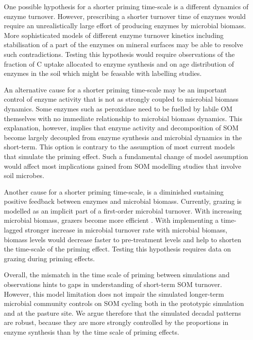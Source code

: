 One possible hypothesis for a shorter priming time-scale is a different dynamics
of enzyme turnover. However, prescribing a shorter turnover time of enzymes would
require an unrealistically large effort of producing enzymes by microbial
biomass. More sophisticated models of different enzyme turnover kinetics
including stabilisation of a part of the enzymes on mineral surfaces
\citep{Burns13} may be able to resolve such contradictions. Testing this
hypothesis would require observations of the fraction of C uptake allocated to
enzyme synthesis and on age distribution of enzymes in the soil which might be
feasable with labelling studies.

An alternative cause for a shorter priming time-scale may be an important
control of enzyme activity that is not as strongly coupled to microbial biomass
dynamics. Some enzymes such as peroxidase need to be fuelled by labile OM
themselves \citep{Rousk14} with no immediate relationship to microbial biomass
dynamics. This explanation, however, implies that enzyme activity and
decomposition of SOM become largely decoupled from enzyme synthesis and
microbial dynamics in the short-term. This option is contrary to the assumption
of most current models that simulate the priming effect. Such a fundamental
change of model assumption would affect most implications gained from
SOM modelling studies that involve soil microbes.

Another cause for a shorter priming time-scale, is a diminished sustaining
positive feedback between enzymes and microbial biomass. Currently, grazing is
modelled as an implicit part of a first-order microbial turnover. With
increasing microbial biomass, grazers become more efficient \citep{Clarholm81}.
With implementing a time-lagged stronger increase in microbial turnover rate
with microbial biomass, biomass levels would decrease faster to pre-treatment
levels and help to shorten the time-scale of the priming effect. Testing this
hypothesis requires data on grazing during priming effects.

Overall, the mismatch in the time scale of priming between simulations and
observations hints to gaps in understanding of short-term SOM turnover. 
However, this model limitation does not impair the
simulated longer-term microbial community controls on SOM cycling both in the
prototypic simulation and at the pasture site. We argue therefore that the
simulated decadal patterns are robust, because they are more strongly
controlled by the proportions in enzyme synthesis than by the time scale of
priming effects. 

